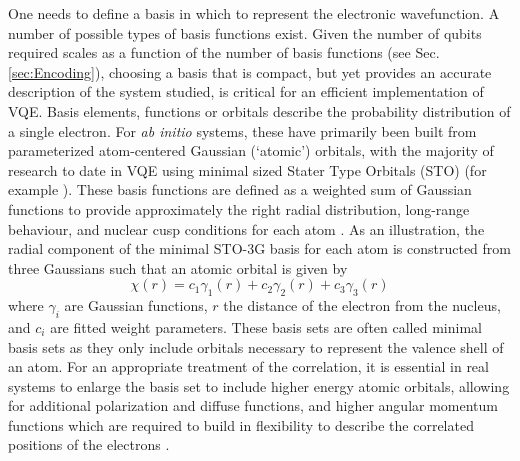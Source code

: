 One needs to define a basis in which to represent the electronic wavefunction. A number of possible types of basis functions exist. Given the number of qubits required scales as a function of the number of basis functions (see Sec.~ \ref{sec:Encoding}), choosing a basis that is compact, but yet provides an accurate description of the system studied, is critical for an efficient implementation of VQE. 
Basis elements, functions or orbitals describe the probability distribution of a single electron. %
For {\em ab initio} systems, these have primarily been built from parameterized atom-centered Gaussian (`atomic') orbitals, with the majority of research to date in VQE using minimal sized Stater Type Orbitals (STO) (for example \cite{Peruzzo2014, Kandala2017, Lee2019}). These basis functions are defined as a weighted sum of Gaussian functions to provide approximately the right radial distribution, long-range behaviour, and nuclear cusp conditions for each atom \cite{Hehre1969,Stewart1970}. %
As an illustration, the radial component of the minimal STO-3G basis for each atom is constructed from three Gaussians such that an atomic orbital is given by 
\begin{equation}
    \chi(r) = c_1 \gamma_1(r) + c_2 \gamma_2(r) + c_3 \gamma_3(r)
\end{equation}
where $\gamma_i$ are Gaussian functions, $r$ the distance of the electron from the nucleus, and $c_i$ are fitted weight parameters. %
These basis sets are often called minimal basis sets as they only include orbitals necessary to represent the valence shell of an atom. For an appropriate treatment of the correlation, it is essential in real systems to enlarge the basis set to include higher energy atomic orbitals, allowing for additional polarization and diffuse functions, and higher angular momentum functions which are required to build in flexibility to describe the correlated positions of the electrons \cite{Helgaker2000}.
